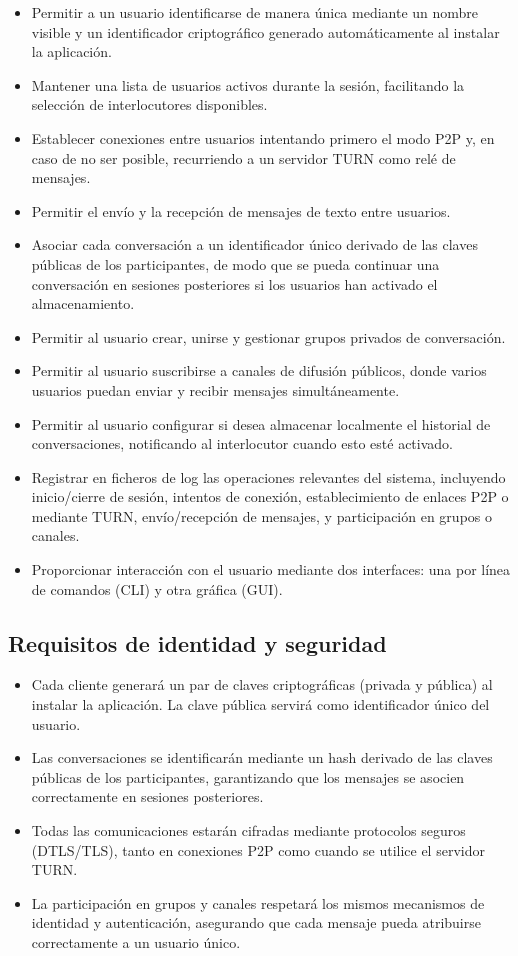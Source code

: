 \documentclass{article}
\begin{document}
  \begin{itemize}
    \item Permitir a un usuario identificarse de manera única mediante un nombre visible y un identificador criptográfico generado automáticamente al instalar la aplicación.
    \item Mantener una lista de usuarios activos durante la sesión, facilitando la selección de interlocutores disponibles.
    \item Establecer conexiones entre usuarios intentando primero el modo P2P y, en caso de no ser posible, recurriendo a un servidor TURN como relé de mensajes.
    \item Permitir el envío y la recepción de mensajes de texto entre usuarios.
    \item Asociar cada conversación a un identificador único derivado de las claves públicas de los participantes, de modo que se pueda continuar una conversación en sesiones posteriores si los usuarios han activado el almacenamiento.
    \item Permitir al usuario crear, unirse y gestionar grupos privados de conversación.
    \item Permitir al usuario suscribirse a canales de difusión públicos, donde varios usuarios puedan enviar y recibir mensajes simultáneamente.
    \item Permitir al usuario configurar si desea almacenar localmente el historial de conversaciones, notificando al interlocutor cuando esto esté activado.
    \item Registrar en ficheros de log las operaciones relevantes del sistema, incluyendo inicio/cierre de sesión, intentos de conexión, establecimiento de enlaces P2P o mediante TURN, envío/recepción de mensajes, y participación en grupos o canales.
    \item Proporcionar interacción con el usuario mediante dos interfaces: una por línea de comandos (CLI) y otra gráfica (GUI).
  \end{itemize}

  \subsection{Requisitos de identidad y seguridad}

  \begin{itemize}
    \item Cada cliente generará un par de claves criptográficas (privada y pública) al instalar la aplicación. La clave pública servirá como identificador único del usuario.
    \item Las conversaciones se identificarán mediante un hash derivado de las claves públicas de los participantes, garantizando que los mensajes se asocien correctamente en sesiones posteriores.
    \item Todas las comunicaciones estarán cifradas mediante protocolos seguros (DTLS/TLS), tanto en conexiones P2P como cuando se utilice el servidor TURN.
    \item La participación en grupos y canales respetará los mismos mecanismos de identidad y autenticación, asegurando que cada mensaje pueda atribuirse correctamente a un usuario único.
  \end{itemize}
\end{document}
